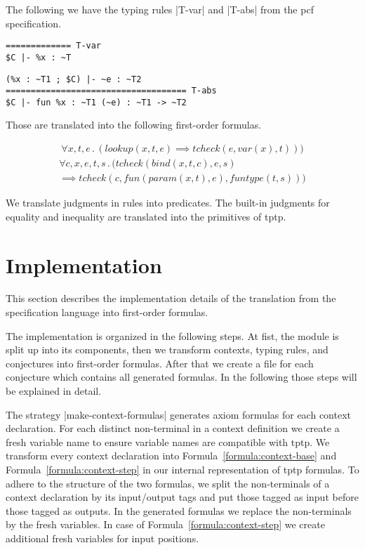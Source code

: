 \begin{example}
  The following we have the typing rules \code|T-var| and \code|T-abs|
  from the \gls{pcf} specification.

\begin{minipage}{.30\linewidth}
\begin{lstlisting}[language=sltc]
%x : ~T in $C
============= T-var
$C |- %x : ~T
\end{lstlisting}
\end{minipage}
\begin{minipage}{.64\linewidth}
\begin{lstlisting}[language=sltc]
(%x : ~T1 ; $C) |- ~e : ~T2
==================================== T-abs
$C |- fun %x : ~T1 (~e) : ~T1 -> ~T2
\end{lstlisting}
\end{minipage}

Those are translated into the following first-order formulas.

\begin{multline}
  \forall x, t, e \,.\, (lookup(x, t, e) \implies tcheck(e, var(x), t)))
\end{multline}
\begin{multline}
  \forall c, x, e, t, s \,.\, (tcheck(bind(x, t, c), e, s) \\ \implies
  tcheck(c, fun(param(x, t), e), funtype(t, s)))
\end{multline}
\end{example}

We translate judgments in rules into predicates. The built-in
judgments for equality and inequality are translated into the
primitives of \gls{tptp}.
\section{Implementation}
\label{sec:implementation-fof}
This section describes the implementation details of the translation
from the specification language into first-order formulas.

The implementation is organized in the following steps. At fist, the
module is split up into its components, then we transform contexts,
typing rules, and conjectures into first-order formulas. After that we
create a file for each conjecture which contains all generated
formulas. In the following those steps will be explained in detail.

The strategy \code|make-context-formulas| generates axiom formulas for
each context declaration. For each distinct non-terminal in a context
definition we create a fresh variable name to ensure variable names
are compatible with \gls{tptp}. We transform every context declaration
into Formula~\ref{formula:context-base} and
Formula~\ref{formula:context-step} in our internal representation of
\gls{tptp} formulas. To adhere to the structure of the two formulas,
we split the non-terminals of a context declaration by its
input/output tags and put those tagged as input before those tagged as
outputs. In the generated formulas we replace the non-terminals by the
fresh variables. In case of Formula~\ref{formula:context-step} we
create additional fresh variables for input positions.

